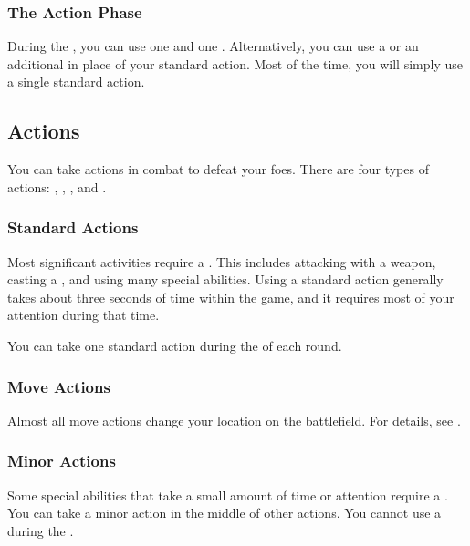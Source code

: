     \subsubsection{The Action Phase}\label{The Action Phase}
      During the , you can use one  and one .
      Alternatively, you can use a  or an additional  in place of your standard action.
      Most of the time, you will simply use a single standard action.

  \subsection{Actions}\label{Actions}

    You can take actions in combat to defeat your foes.
    There are four types of actions: , , , and .

    \subsubsection{Standard Actions}\label{Standard Actions}
      Most significant activities require a .
      This includes attacking with a weapon, casting a , and using many special abilities.
      Using a standard action generally takes about three seconds of time within the game, and it requires most of your attention during that time.

      You can take one standard action during the  of each round.

    \subsubsection{Move Actions}\label{Move Actions}
      Almost all move actions change your location on the battlefield.
      For details, see .

    \subsubsection{Minor Actions}\label{Minor Actions}
      Some special abilities that take a small amount of time or attention require a .
      You can take a minor action in the middle of other actions.
      You cannot use a  during the .

